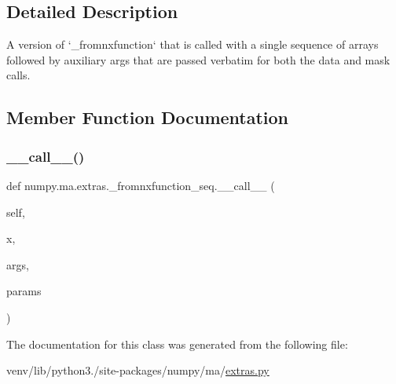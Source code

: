 \subsection{Detailed Description}
\begin{DoxyVerb}A version of `_fromnxfunction` that is called with a single sequence
of arrays followed by auxiliary args that are passed verbatim for
both the data and mask calls.
\end{DoxyVerb}
 

\subsection{Member Function Documentation}
\mbox{\label{classnumpy_1_1ma_1_1extras_1_1__fromnxfunction__seq_a2621ce425bdecc24caf01e119ec051f6}} 
\subsubsection{\texorpdfstring{\+\_\+\+\_\+call\+\_\+\+\_\+()}{\_\_call\_\_()}}
{\footnotesize\ttfamily def numpy.\+ma.\+extras.\+\_\+fromnxfunction\+\_\+seq.\+\_\+\+\_\+call\+\_\+\+\_\+ (\begin{DoxyParamCaption}\item[{}]{self,  }\item[{}]{x,  }\item[{}]{args,  }\item[{}]{params }\end{DoxyParamCaption})}



The documentation for this class was generated from the following file\+:\begin{DoxyCompactItemize}
\item 
venv/lib/python3./site-\/packages/numpy/ma/\hyperlink{extras_8py}{extras.\+py}\end{DoxyCompactItemize}
